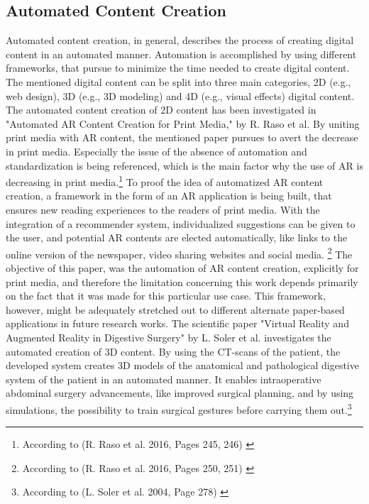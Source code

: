 \documentclass[12pt,a4paper,oneside,american,parskip=half]{article}
\begin{document}
\begin{justify}
\begin{normalsize}
\subsection{Automated Content Creation}
Automated content creation, in general, describes the process of creating digital content in an automated manner. Automation is accomplished by using different frameworks, that pursue to minimize the time needed to create digital content.
The mentioned digital content can be split into three main categories, 2D (e.g., web design), 3D (e.g., 3D modeling) and 4D (e.g., visual effects) digital content.
\newline
\newline
The automated content creation of 2D content has been investigated in "Automated AR Content Creation for Print Media," by R. Raso et al. By uniting print media with AR content, the mentioned paper pursues to avert the decrease in print media. Especially the issue of the absence of automation and standardization is being referenced, which is the main factor why the use of AR is decreasing in print media.\footnote{According to (R. Raso et al. 2016, Pages 245, 246) \cite{rocco}}
\newline
To proof the idea of automatized AR content creation, a framework in the form of an AR application is being built, that ensures new reading experiences to the readers of print media. With the integration of a recommender system, individualized suggestions can be given to the user, and potential AR contents are elected automatically, like links to the online version of the newspaper, video sharing websites and social media. \footnote{According to (R. Raso et al. 2016, Pages 250, 251) \cite{rocco}}
\newline
The objective of this paper, was the automation of AR content creation, explicitly for print media, and therefore the limitation concerning this work depends primarily on the fact that it was made for this particular use case. This framework, however, might be adequately stretched out to different alternate paper-based applications in future research works.
\newline
\newline
The scientific paper "Virtual Reality and Augmented Reality in Digestive Surgery" by L. Soler et al. investigates the automated creation of 3D content. By using the CT-scans of the patient, the developed system creates 3D models of the anatomical and pathological digestive system of the patient in an automated manner. It enables intraoperative abdominal surgery advancements, like improved surgical planning, and by using simulations, the possibility to train surgical gestures before carrying them out.\footnote{According to (L. Soler et al. 2004, Page 278) \cite{digestiv}}

\end{normalsize}
\end{justify}
\end{document}

